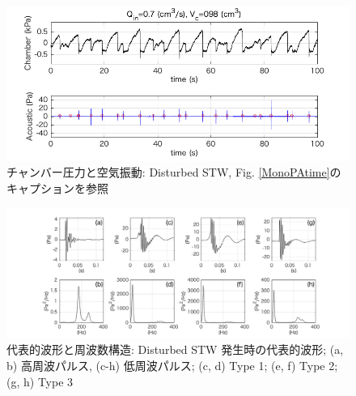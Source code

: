 \documentclass[12pt]{article}
\begin{document}
\begin{figure}[H]
\begin{center}
\includegraphics[scale=1] {DistPAtime.png} 
\caption[チャンバー圧力と空気振動: Disturbed STW]
{チャンバー圧力と空気振動: Disturbed STW, Fig. \ref{MonoPAtime}のキャプションを参照}
\label{DistPAtime}
\end{center}
\end{figure} 

\begin{landscape}
\begin{figure}[H]
\begin{center}
\includegraphics[scale=1] {Distwaveform.png} 
\caption[代表的波形と周波数構造: Disturbed STW]
{代表的波形と周波数構造: Disturbed STW 発生時の代表的波形; (a, b) 高周波パルス, (c-h) 低周波パルス; (c, d) Type 1; (e, f) Type 2; (g, h) Type 3}
\label{Distwaveform}
\end{center}
\end{figure} 
\end{landscape}
\end{document}
